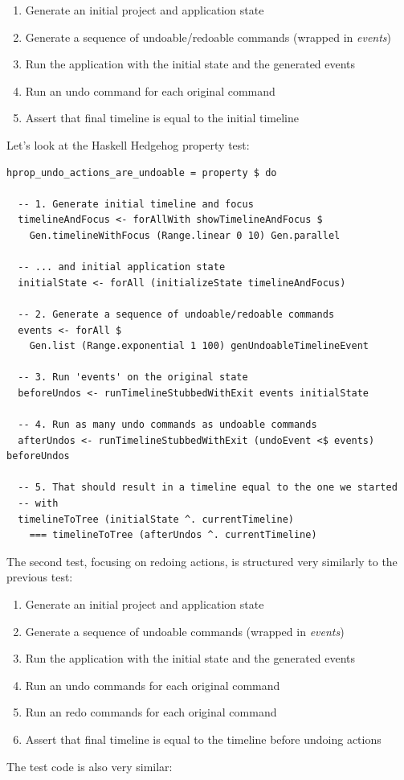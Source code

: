 \begin{enumerate}
\item Generate an initial project and application state
\item Generate a sequence of undoable/redoable commands (wrapped in \textit{events})
\item Run the application with the initial state and the generated events
\item Run an undo command for each original command
\item Assert that final timeline is equal to the initial timeline
\end{enumerate}
Let's look at the Haskell Hedgehog property test:

\begin{verbatim}
hprop_undo_actions_are_undoable = property $ do

  -- 1. Generate initial timeline and focus
  timelineAndFocus <- forAllWith showTimelineAndFocus $
    Gen.timelineWithFocus (Range.linear 0 10) Gen.parallel

  -- ... and initial application state
  initialState <- forAll (initializeState timelineAndFocus)

  -- 2. Generate a sequence of undoable/redoable commands
  events <- forAll $
    Gen.list (Range.exponential 1 100) genUndoableTimelineEvent

  -- 3. Run 'events' on the original state
  beforeUndos <- runTimelineStubbedWithExit events initialState

  -- 4. Run as many undo commands as undoable commands
  afterUndos <- runTimelineStubbedWithExit (undoEvent <$ events) beforeUndos

  -- 5. That should result in a timeline equal to the one we started
  -- with
  timelineToTree (initialState ^. currentTimeline)
    === timelineToTree (afterUndos ^. currentTimeline)
\end{verbatim}
The second test, focusing on redoing actions, is structured very similarly to the previous test:

\begin{enumerate}
\item Generate an initial project and application state
\item Generate a sequence of undoable commands (wrapped in \textit{events})
\item Run the application with the initial state and the generated events
\item Run an undo commands for each original command
\item Run an redo commands for each original command
\item Assert that final timeline is equal to the timeline before undoing actions
\end{enumerate}
The test code is also very similar:

